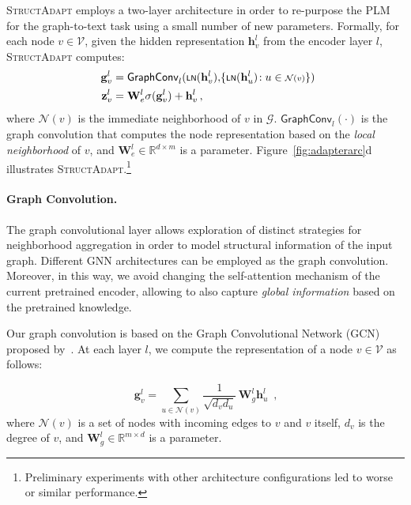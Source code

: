 \documentclass[11pt]{article}
\newcommand{\graphadapter}{{\small\textsc{StructAdapt}}\xspace}
\begin{document}
\graphadapter employs a two-layer architecture in order to re-purpose the PLM for the graph-to-text task using a small number of new parameters. Formally, for each node $v \in \mathcal{V}$, given the hidden representation $\mathbf{h}^{l}_v$ from the encoder layer $l$, \graphadapter computes:
\begin{align}
\mathbf{g}^{l}_{v} &= {\mathsf{GraphConv}}_{l} ({\scriptstyle\mathsf{LN}}(\mathbf{h}^{l}_v),\!\{ {\scriptstyle\mathsf{LN}}(\mathbf{h}^{l}_u)\!: u \in {\scriptstyle\mathcal{N}(v)} \})\hspace{-.5em}  \nonumber \\
\mathbf{z}^{l}_v &= \mathbf{W}^{l}_{e} \sigma (\mathbf{g}^{l}_{v}) + \mathbf{h}^{l}_v \, ,
\end{align}
where $\mathcal{N}(v)$ is the immediate neighborhood of $v$ in $\mathcal{G}$. $\mathsf{GraphConv}_{l}(\cdot)$ is the graph convolution that computes the node representation based on the \emph{local neighborhood} of $v$, and $\mathbf{W}^{l}_e \in \mathbb{R}^{d \times m}$ is a parameter. Figure~\ref{fig:adapterarc}d illustrates \graphadapter.\footnote{Preliminary experiments with other architecture configurations led to worse or similar performance.}

\paragraph{Graph Convolution.} The graph convolutional layer allows exploration of distinct strategies for neighborhood aggregation in order to model structural information of the input graph. Different GNN architectures \cite{velickovic2018graph, xu2018how} can be employed as the graph convolution. Moreover, in this way, we avoid changing the self-attention mechanism of the current pretrained encoder, allowing to also capture \emph{global information} based on the pretrained knowledge.

Our graph convolution is based on the Graph Convolutional Network (GCN) proposed by~\citet{Kipf:2016tc}. At each layer $l$, we compute the representation of a node $v \in \mathcal{V}$ as follows:  

\begin{equation}
        \mathbf{g}^{l}_{v} =
        \sum_{u \in \mathcal{N}(v)} \frac{1}{\sqrt{d_{v}d_{u}}}  \, \mathbf{W}^{l}_g \mathbf{h}^{l}_u  \, \,\,\text{,}
\label{eq:3}
\end{equation}
where $\mathcal{N}(v)$ is a set of nodes with incoming edges to $v$ and $v$ itself, $d_{v}$ is the degree of $v$, and $\mathbf{W}^{l}_g \in \mathbb{R}^{m \times d}$ is a parameter. 
\end{document}

